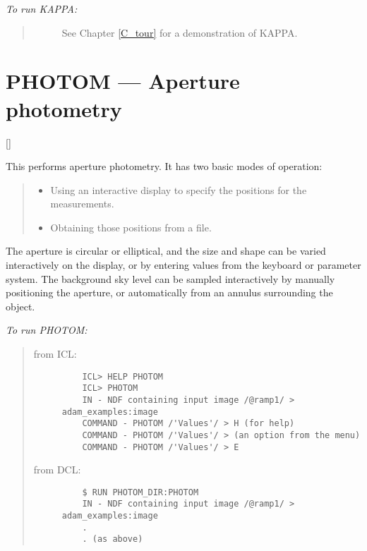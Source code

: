 {\em To run KAPPA:}\hfill
\begin{quote}
\begin{description}
\item [] See Chapter \ref{C_tour} for a demonstration of KAPPA.
\end{description}
\end{quote}

\newpage

\section{PHOTOM --- Aperture photometry} 

\vspace{-11mm}

\hfill []

\vspace{5mm}

This performs aperture photometry.
It has two basic modes of operation:

{\small
\begin{quote}
\begin{itemize}
\item Using an interactive display to specify the positions for the
 measurements.
\item Obtaining those positions from a file.
\end{itemize}
\end{quote}
}

The aperture is circular or elliptical, and the size and shape can be varied
interactively on the display, or by entering values from the keyboard or
parameter system.
The background sky level can be sampled interactively by manually positioning
the aperture, or automatically from an annulus surrounding the object.

{\em To run PHOTOM:}\hfill
\begin{quote}
\begin{description}

\item [from ICL:]\hfill

\begin{small}
\begin{verbatim}
    ICL> HELP PHOTOM
    ICL> PHOTOM
    IN - NDF containing input image /@ramp1/ > adam_examples:image
    COMMAND - PHOTOM /'Values'/ > H (for help)
    COMMAND - PHOTOM /'Values'/ > (an option from the menu)
    COMMAND - PHOTOM /'Values'/ > E
\end{verbatim}
\end{small}

\item [from DCL:]\hfill

\begin{small}
\begin{verbatim}
    $ RUN PHOTOM_DIR:PHOTOM
    IN - NDF containing input image /@ramp1/ > adam_examples:image
    .
    . (as above)
\end{verbatim}
\end{small}

\end{description}
\end{quote}

